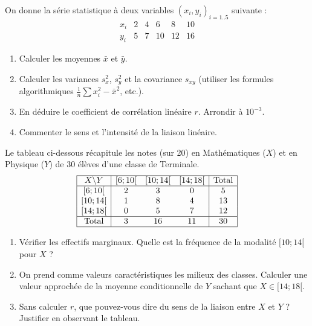 \documentclass[11pt]{article}
\begin{document}
\begin{exercice}
On donne la série statistique à deux variables $(x_i, y_i)_{i=1..5}$ suivante :
\[
\begin{array}{c|ccccc}
x_i & 2 & 4 & 6 & 8 & 10 \\ \hline
y_i & 5 & 7 & 10 & 12 & 16
\end{array}
\]
\begin{enumerate}
\item Calculer les moyennes $\bar{x}$ et $\bar{y}$.
\item Calculer les variances $s_x^2$, $s_y^2$ et la covariance $s_{xy}$ (utiliser les formules algorithmiques $\frac{1}{n}\sum x_i^2 - \bar{x}^2$, etc.).
\item En déduire le coefficient de corrélation linéaire $r$. Arrondir à $10^{-3}$.
\item Commenter le sens et l'intensité de la liaison linéaire.
\end{enumerate}
\end{exercice}

\begin{exercice}
Le tableau ci-dessous récapitule les notes (sur 20) en Mathématiques ($X$) et en Physique ($Y$) de 30 élèves d'une classe de Terminale.
\[
\begin{array}{|c|ccc|c|}\hline
X \backslash Y & [6;10[ & [10;14[ & [14;18[ & \text{Total} \\ \hline
\relax [6;10[ & 2 & 3 & 0 & 5 \\
\relax [10;14[ & 1 & 8 & 4 & 13 \\
\relax [14;18[ & 0 & 5 & 7 & 12 \\ \hline
\text{Total} & 3 & 16 & 11 & 30 \\ \hline
\end{array}
\]
\begin{enumerate}
\item Vérifier les effectifs marginaux. Quelle est la fréquence de la modalité $[10;14[$ pour $X$ ?
\item On prend comme valeurs caractéristiques les milieux des classes. Calculer une valeur approchée de la moyenne conditionnelle de $Y$ sachant que $X \in [14;18[$.
\item Sans calculer $r$, que pouvez-vous dire du sens de la liaison entre $X$ et $Y$ ? Justifier en observant le tableau.
\end{enumerate}
\end{exercice}
\end{document}
